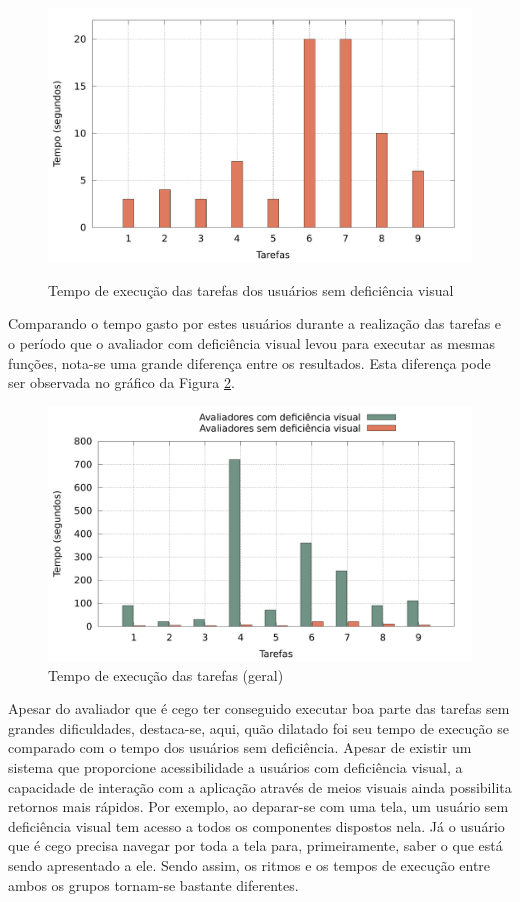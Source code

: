 \begin{figure}[H]
	\centering
	\caption[Tempo de execução -- Usuários sem deficiência visual]{Tempo de execução das tarefas dos usuários sem deficiência visual}
	\includegraphics[width=0.8\linewidth]{./charts/tempo-sem-dv.pdf}
	\label{fig:tempo-sem-dv}
\end{figure}

Comparando o tempo gasto por estes usuários durante a realização das tarefas e o período que o avaliador com deficiência visual levou para executar as mesmas funções, nota-se uma grande diferença entre os resultados. Esta diferença pode ser observada no gráfico da Figura \ref{fig:tempo}.

\begin{figure}[H]
	\centering
	\caption[Tempo de execução -- Geral]{Tempo de execução das tarefas (geral)}
	\label{fig:tempo}
	\includegraphics[width=0.8\linewidth]{./charts/tempo.pdf}
\end{figure}
Apesar do avaliador que é cego ter conseguido executar boa parte das tarefas sem grandes dificuldades, destaca-se, aqui, quão dilatado foi seu tempo de execução se comparado com o tempo dos usuários sem deficiência. Apesar de existir um sistema que proporcione acessibilidade a usuários com deficiência visual, a capacidade de interação com a aplicação através de meios visuais ainda possibilita retornos mais rápidos. Por exemplo, ao deparar-se com uma tela, um usuário sem deficiência visual tem acesso a todos os componentes dispostos nela. Já o usuário que é cego precisa navegar por toda a tela para, primeiramente, saber o que está sendo apresentado a ele. Sendo assim, os ritmos e os tempos de execução entre ambos os grupos tornam-se bastante diferentes.

